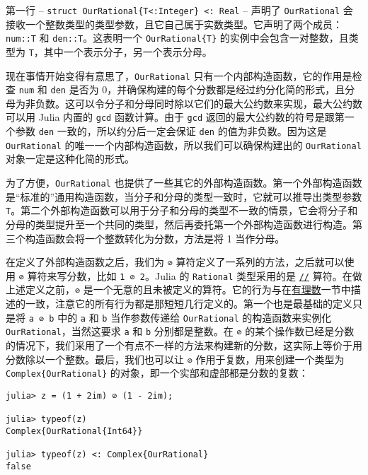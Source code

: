 第一行 – \texttt{struct OurRational\{T<:Integer\} <: Real} – 声明了 \texttt{OurRational} 会接收一个整数类型的类型参数，且它自己属于实数类型。它声明了两个成员：\texttt{num::T} 和 \texttt{den::T}。这表明一个 \texttt{OurRational\{T\}} 的实例中会包含一对整数，且类型为 \texttt{T}，其中一个表示分子，另一个表示分母。



现在事情开始变得有意思了，\texttt{OurRational} 只有一个内部构造函数，它的作用是检查 \texttt{num} 和 \texttt{den} 是否为 0，并确保构建的每个分数都是经过约分化简的形式，且分母为非负数。这可以令分子和分母同时除以它们的最大公约数来实现，最大公约数可以用 Julia 内置的 \texttt{gcd} 函数计算。由于 \texttt{gcd} 返回的最大公约数的符号是跟第一个参数 \texttt{den} 一致的，所以约分后一定会保证 \texttt{den} 的值为非负数。因为这是 \texttt{OurRational} 的唯一一个内部构造函数，所以我们可以确保构建出的 \texttt{OurRational} 对象一定是这种化简的形式。



为了方便，\texttt{OurRational} 也提供了一些其它的外部构造函数。第一个外部构造函数是“标准的”通用构造函数，当分子和分母的类型一致时，它就可以推导出类型参数 \texttt{T}。第二个外部构造函数可以用于分子和分母的类型不一致的情景，它会将分子和分母的类型提升至一个共同的类型，然后再委托第一个外部构造函数进行构造。第三个构造函数会将一个整数转化为分数，方法是将 1 当作分母。



在定义了外部构造函数之后，我们为 \texttt{⊘} 算符定义了一系列的方法，之后就可以使用 \texttt{⊘} 算符来写分数，比如 \texttt{1 ⊘ 2}。Julia 的 \texttt{Rational} 类型采用的是 \hyperlink{17539582191808611917}{\texttt{//}} 算符。在做上述定义之前，\texttt{⊘} 是一个无意的且未被定义的算符。它的行为与在\hyperlink{30883190695696392}{有理数}一节中描述的一致，注意它的所有行为都是那短短几行定义的。第一个也是最基础的定义只是将 \texttt{a ⊘ b} 中的 \texttt{a} 和 \texttt{b} 当作参数传递给 \texttt{OurRational} 的构造函数来实例化 \texttt{OurRational}，当然这要求 \texttt{a} 和 \texttt{b} 分别都是整数。在 \texttt{⊘} 的某个操作数已经是分数的情况下，我们采用了一个有点不一样的方法来构建新的分数，这实际上等价于用分数除以一个整数。最后，我们也可以让 \texttt{⊘} 作用于复数，用来创建一个类型为 \texttt{Complex\{OurRational\}} 的对象，即一个实部和虚部都是分数的复数：




\begin{verbatim}
julia> z = (1 + 2im) ⊘ (1 - 2im);

julia> typeof(z)
Complex{OurRational{Int64}}

julia> typeof(z) <: Complex{OurRational}
false
\end{verbatim}



